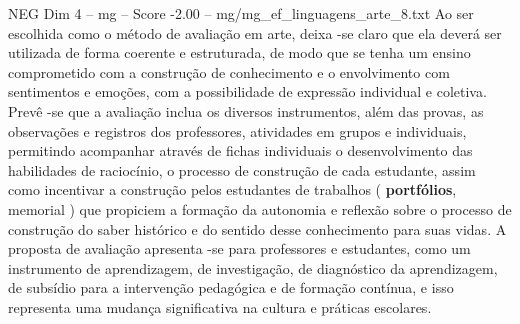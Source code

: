 \begin{textsample}{NEG Dim 4 – mg – Score -2.00 – mg/mg\_ef\_linguagens\_arte\_8.txt}
Ao ser escolhida como o método de avaliação em arte, deixa -se claro que ela deverá ser utilizada de forma coerente e estruturada, de modo que se tenha um ensino comprometido com a construção de conhecimento e o envolvimento com sentimentos e emoções, com a possibilidade de expressão individual e coletiva.
Prevê -se que a avaliação inclua os diversos instrumentos, além das provas, as observações e registros dos professores, atividades em grupos e individuais, permitindo acompanhar através de fichas individuais o desenvolvimento das habilidades de raciocínio, o processo de construção de cada estudante, assim como incentivar a construção pelos estudantes de trabalhos ( \textbf{portfólios}, memorial ) que propiciem a formação da autonomia e reflexão sobre o processo de construção do saber histórico e do sentido desse conhecimento para suas vidas.
A proposta de avaliação apresenta -se para professores e estudantes, como um instrumento de aprendizagem, de investigação, de diagnóstico da aprendizagem, de subsídio para a intervenção pedagógica e de formação contínua, e isso representa uma mudança significativa na cultura e práticas escolares.

\end{textsample}
